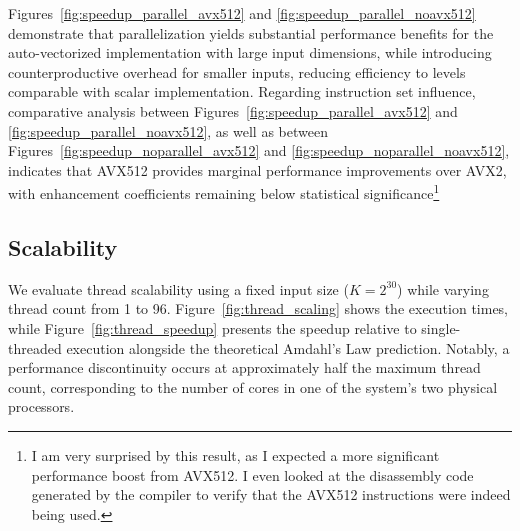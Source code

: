 \documentclass[10pt]{report}
\begin{document}
Figures~\ref{fig:speedup_parallel_avx512} and \ref{fig:speedup_parallel_noavx512} demonstrate that parallelization yields substantial performance benefits for the auto-vectorized implementation with large input dimensions, while introducing counterproductive overhead for smaller inputs, reducing efficiency to levels comparable with scalar implementation. Regarding instruction set influence, comparative analysis between Figures~\ref{fig:speedup_parallel_avx512} and \ref{fig:speedup_parallel_noavx512}, as well as between Figures~\ref{fig:speedup_noparallel_avx512} and \ref{fig:speedup_noparallel_noavx512}, indicates that AVX512 provides marginal performance improvements over AVX2, with enhancement coefficients remaining below statistical significance\footnote{I am very surprised by this result, as I expected a more significant performance boost from AVX512. I even looked at the disassembly code generated by the compiler to verify that the AVX512 instructions were indeed being used.}

\subsection*{Scalability}

We evaluate thread scalability using a fixed input size ($K = 2^{30}$) while varying thread count from 1 to 96. Figure~\ref{fig:thread_scaling} shows the execution times, while Figure~\ref{fig:thread_speedup} presents the speedup relative to single-threaded execution alongside the theoretical Amdahl's Law prediction. Notably, a performance discontinuity occurs at approximately half the maximum thread count, corresponding to the number of cores in one of the system's two physical processors.
\end{document}
